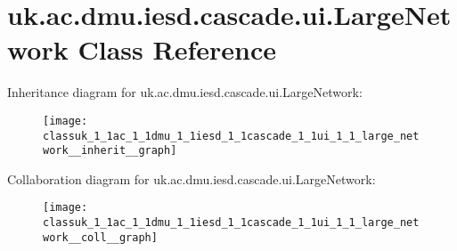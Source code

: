 \hypertarget{classuk_1_1ac_1_1dmu_1_1iesd_1_1cascade_1_1ui_1_1_large_network}{\section{uk.\-ac.\-dmu.\-iesd.\-cascade.\-ui.\-Large\-Network Class Reference}
\label{classuk_1_1ac_1_1dmu_1_1iesd_1_1cascade_1_1ui_1_1_large_network}
}


Inheritance diagram for uk.\-ac.\-dmu.\-iesd.\-cascade.\-ui.\-Large\-Network\-:\nopagebreak
\begin{figure}[H]
\begin{center}
\leavevmode
\texttt{[image: classuk\_1\_1ac\_1\_1dmu\_1\_1iesd\_1\_1cascade\_1\_1ui\_1\_1\_large\_network\_\_inherit\_\_graph]}
\end{center}
\end{figure}


Collaboration diagram for uk.\-ac.\-dmu.\-iesd.\-cascade.\-ui.\-Large\-Network\-:\nopagebreak
\begin{figure}[H]
\begin{center}
\leavevmode
\texttt{[image: classuk\_1\_1ac\_1\_1dmu\_1\_1iesd\_1\_1cascade\_1\_1ui\_1\_1\_large\_network\_\_coll\_\_graph]}
\end{center}
\end{figure}
